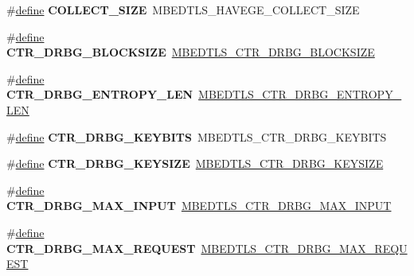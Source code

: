 \begin{DoxyCompactItemize}
\item 
\mbox{\label{compat-1_83_8h_a3a37b97f6111e51ff65bd8bf3fd8677b}} 
\#\hyperlink{structdefine}{define} {\bfseries C\+O\+L\+L\+E\+C\+T\+\_\+\+S\+I\+ZE}~M\+B\+E\+D\+T\+L\+S\+\_\+\+H\+A\+V\+E\+G\+E\+\_\+\+C\+O\+L\+L\+E\+C\+T\+\_\+\+S\+I\+ZE
\item 
\mbox{\label{compat-1_83_8h_a907251d56e7adb3d795bfe04e1f36865}} 
\#\hyperlink{structdefine}{define} {\bfseries C\+T\+R\+\_\+\+D\+R\+B\+G\+\_\+\+B\+L\+O\+C\+K\+S\+I\+ZE}~\hyperlink{ctr__drbg_8h_a73f77e540752ebec67e2477f776ed8a9}{M\+B\+E\+D\+T\+L\+S\+\_\+\+C\+T\+R\+\_\+\+D\+R\+B\+G\+\_\+\+B\+L\+O\+C\+K\+S\+I\+ZE}
\item 
\mbox{\label{compat-1_83_8h_aad464fda72b082db273843523b6de363}} 
\#\hyperlink{structdefine}{define} {\bfseries C\+T\+R\+\_\+\+D\+R\+B\+G\+\_\+\+E\+N\+T\+R\+O\+P\+Y\+\_\+\+L\+EN}~\hyperlink{ctr__drbg_8h_ac71c76b50eb79055e11f86d0d796b979}{M\+B\+E\+D\+T\+L\+S\+\_\+\+C\+T\+R\+\_\+\+D\+R\+B\+G\+\_\+\+E\+N\+T\+R\+O\+P\+Y\+\_\+\+L\+EN}
\item 
\mbox{\label{compat-1_83_8h_ad7fddfff369d259329ff0f7c64063da0}} 
\#\hyperlink{structdefine}{define} {\bfseries C\+T\+R\+\_\+\+D\+R\+B\+G\+\_\+\+K\+E\+Y\+B\+I\+TS}~M\+B\+E\+D\+T\+L\+S\+\_\+\+C\+T\+R\+\_\+\+D\+R\+B\+G\+\_\+\+K\+E\+Y\+B\+I\+TS
\item 
\mbox{\label{compat-1_83_8h_a7e724588e94f73bd3fb7623e3f191913}} 
\#\hyperlink{structdefine}{define} {\bfseries C\+T\+R\+\_\+\+D\+R\+B\+G\+\_\+\+K\+E\+Y\+S\+I\+ZE}~\hyperlink{ctr__drbg_8h_af81b83e7d7d9709f0b61c6ee34ee848e}{M\+B\+E\+D\+T\+L\+S\+\_\+\+C\+T\+R\+\_\+\+D\+R\+B\+G\+\_\+\+K\+E\+Y\+S\+I\+ZE}
\item 
\mbox{\label{compat-1_83_8h_aa422ee06cd5836113c0068996fa9560c}} 
\#\hyperlink{structdefine}{define} {\bfseries C\+T\+R\+\_\+\+D\+R\+B\+G\+\_\+\+M\+A\+X\+\_\+\+I\+N\+P\+UT}~\hyperlink{ctr__drbg_8h_a9eeb62804173b22977cca5a7565bbe78}{M\+B\+E\+D\+T\+L\+S\+\_\+\+C\+T\+R\+\_\+\+D\+R\+B\+G\+\_\+\+M\+A\+X\+\_\+\+I\+N\+P\+UT}
\item 
\mbox{\label{compat-1_83_8h_a97273e0c80ab6111bf79f05834f174bf}} 
\#\hyperlink{structdefine}{define} {\bfseries C\+T\+R\+\_\+\+D\+R\+B\+G\+\_\+\+M\+A\+X\+\_\+\+R\+E\+Q\+U\+E\+ST}~\hyperlink{ctr__drbg_8h_a5b787e6157d91055d7c07d40f519cf52}{M\+B\+E\+D\+T\+L\+S\+\_\+\+C\+T\+R\+\_\+\+D\+R\+B\+G\+\_\+\+M\+A\+X\+\_\+\+R\+E\+Q\+U\+E\+ST}

\end{DoxyCompactItemize}
